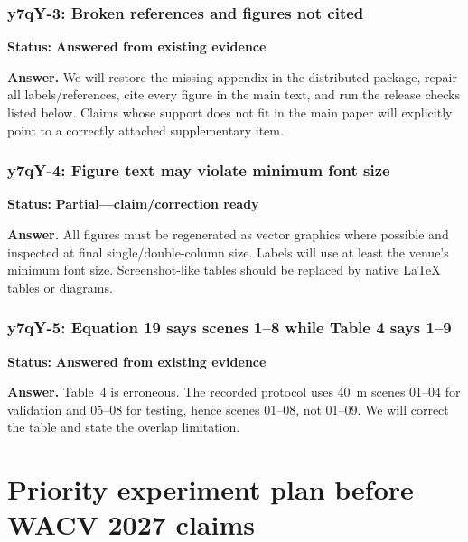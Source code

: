 \documentclass[10pt]{article}
\newcommand{\answered}{\textcolor{answered}{\textbf{Answered from existing evidence}}}
\newcommand{\partialstatus}{\textcolor{partial}{\textbf{Partial---claim/correction ready}}}
\newenvironment{reviewpoint}[2]
  {\subsubsection{#1}\noindent\textbf{Status:} #2\par\smallskip}
  {}
\begin{document}
\begin{reviewpoint}{y7qY-3: Broken references and figures not cited}{\answered}
\textbf{Answer.} We will restore the missing appendix in the distributed package, repair
all labels/references, cite every figure in the main text, and run the release checks listed
below. Claims whose support does not fit in the main paper will explicitly point to a
correctly attached supplementary item.
\end{reviewpoint}

\begin{reviewpoint}{y7qY-4: Figure text may violate minimum font size}{\partialstatus}
\textbf{Answer.} All figures must be regenerated as vector graphics where possible and
inspected at final single/double-column size. Labels will use at least the venue's minimum
font size. Screenshot-like tables should be replaced by native LaTeX tables or diagrams.
\end{reviewpoint}

\begin{reviewpoint}{y7qY-5: Equation 19 says scenes 1--8 while Table 4 says 1--9}{\answered}
\textbf{Answer.} Table~4 is erroneous. The recorded protocol uses 40~m scenes 01--04 for
validation and 05--08 for testing, hence scenes 01--08, not 01--09. We will correct the
table and state the overlap limitation.
\end{reviewpoint}

\section{Priority experiment plan before WACV 2027 claims}
\end{document}
